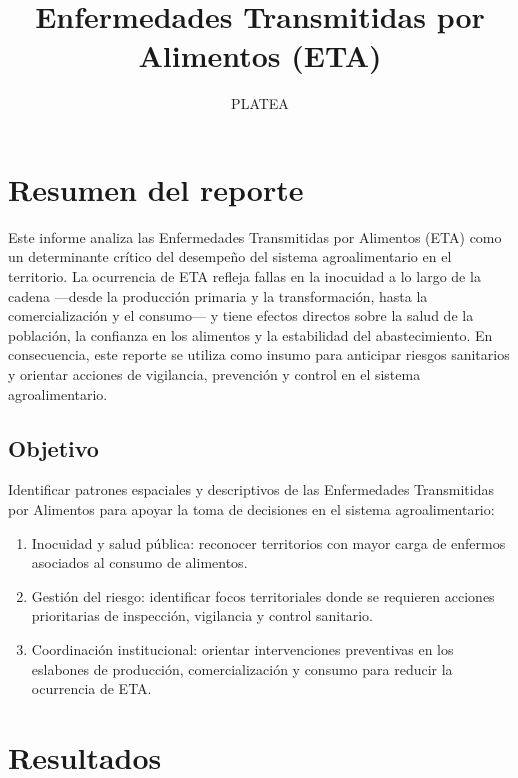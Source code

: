 \documentclass[
]{article}
\title{Enfermedades Transmitidas por Alimentos (ETA)}
\subtitle{PLATEA}
\author{}
\date{\vspace{-2.5em}}
\begin{document}
\maketitle

{
\setcounter{tocdepth}{2}
\tableofcontents
}
\section{Resumen del reporte}\label{resumen-del-reporte}

Este informe analiza las Enfermedades Transmitidas por Alimentos (ETA)
como un determinante crítico del desempeño del sistema agroalimentario
en el territorio. La ocurrencia de ETA refleja fallas en la inocuidad a
lo largo de la cadena ---desde la producción primaria y la
transformación, hasta la comercialización y el consumo--- y tiene
efectos directos sobre la salud de la población, la confianza en los
alimentos y la estabilidad del abastecimiento. En consecuencia, este
reporte se utiliza como insumo para anticipar riesgos sanitarios y
orientar acciones de vigilancia, prevención y control en el sistema
agroalimentario.

\subsection{Objetivo}\label{objetivo}

Identificar patrones espaciales y descriptivos de las Enfermedades
Transmitidas por Alimentos para apoyar la toma de decisiones en el
sistema agroalimentario:

\begin{enumerate}
\def\labelenumi{\arabic{enumi}.}
\item
  Inocuidad y salud pública: reconocer territorios con mayor carga de
  enfermos asociados al consumo de alimentos.
\item
  Gestión del riesgo: identificar focos territoriales donde se requieren
  acciones prioritarias de inspección, vigilancia y control sanitario.
\item
  Coordinación institucional: orientar intervenciones preventivas en los
  eslabones de producción, comercialización y consumo para reducir la
  ocurrencia de ETA.
\end{enumerate}

\section{Resultados}\label{resultados}
\end{document}
